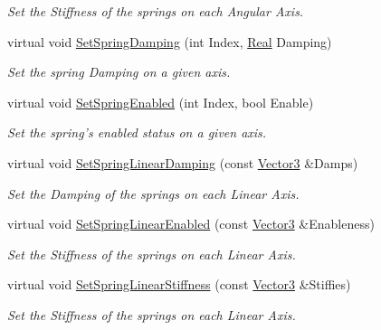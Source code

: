 \begin{DoxyCompactItemize}
\begin{DoxyCompactList}\small\item\em Set the Stiffness of the springs on each Angular Axis. \item\end{DoxyCompactList}\item 
virtual void \hyperlink{classphys_1_1Generic6DofSpringConstraint_a5e39d3b9601b1d8ec6e3197b1cc999a7}{SetSpringDamping} (int Index, \hyperlink{namespacephys_af7eb897198d265b8e868f45240230d5f}{Real} Damping)
\begin{DoxyCompactList}\small\item\em Set the spring Damping on a given axis. \item\end{DoxyCompactList}\item 
virtual void \hyperlink{classphys_1_1Generic6DofSpringConstraint_a49ab6cbd0859e455391b1b676b1309b7}{SetSpringEnabled} (int Index, bool Enable)
\begin{DoxyCompactList}\small\item\em Set the spring's enabled status on a given axis. \item\end{DoxyCompactList}\item 
virtual void \hyperlink{classphys_1_1Generic6DofSpringConstraint_a86776512ae4f20d4143aa4c8901ab355}{SetSpringLinearDamping} (const \hyperlink{classphys_1_1Vector3}{Vector3} \&Damps)
\begin{DoxyCompactList}\small\item\em Set the Damping of the springs on each Linear Axis. \item\end{DoxyCompactList}\item 
virtual void \hyperlink{classphys_1_1Generic6DofSpringConstraint_a561603d0470dc20eb74ee79cc1131c52}{SetSpringLinearEnabled} (const \hyperlink{classphys_1_1Vector3}{Vector3} \&Enableness)
\begin{DoxyCompactList}\small\item\em Set the Stiffness of the springs on each Linear Axis. \item\end{DoxyCompactList}\item 
virtual void \hyperlink{classphys_1_1Generic6DofSpringConstraint_a3cb5c0a8cfacc634728828eb85b2b025}{SetSpringLinearStiffness} (const \hyperlink{classphys_1_1Vector3}{Vector3} \&Stiffies)
\begin{DoxyCompactList}\small\item\em Set the Stiffness of the springs on each Linear Axis. \item\end{DoxyCompactList}\item 

\end{DoxyCompactItemize}
